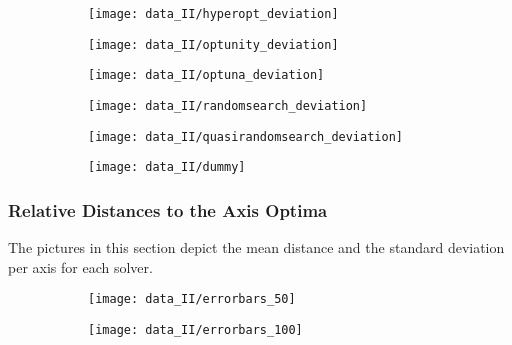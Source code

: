 \begin{figure}[h]
	\begin{subfigure}{0.5\textwidth}
		\texttt{[image: data\_II/hyperopt\_deviation]}
		\label{fig:hyperopt_deviation_II}
	\end{subfigure}
	\begin{subfigure}{0.5\textwidth}
		\texttt{[image: data\_II/optunity\_deviation]}
		\label{fig:optunity_deviation_II}
	\end{subfigure}
\end{figure}

\begin{figure}[h]
	\begin{subfigure}{0.5\textwidth}
		\texttt{[image: data\_II/optuna\_deviation]} 
		\label{fig:optuna_deviation_II}
	\end{subfigure}
	\begin{subfigure}{0.5\textwidth}
		\texttt{[image: data\_II/randomsearch\_deviation]}
		\label{fig:randomsearch_deviation_II}
	\end{subfigure}
\end{figure}

\begin{figure}[h]
	\begin{subfigure}{0.5\textwidth}
		\texttt{[image: data\_II/quasirandomsearch\_deviation]} 
		\label{fig:quasirandomsearch_deviation_II}
	\end{subfigure}
	\begin{subfigure}{0.5\textwidth}
		\texttt{[image: data\_II/dummy]}
		\label{fig:dummy2_II}
	\end{subfigure}
\end{figure}


\newpage


\subsubsection{Relative Distances to the Axis Optima}

The pictures in this section depict the mean distance and the standard deviation per axis for each solver.

\begin{figure}[h]
	\begin{subfigure}{0.5\textwidth}
		\texttt{[image: data\_II/errorbars\_50]}
		\label{fig:errorbars_50_II}
	\end{subfigure}
	\begin{subfigure}{0.5\textwidth}
		\texttt{[image: data\_II/errorbars\_100]}
		\label{fig:errorbars_100_II}
	\end{subfigure}
\end{figure}

